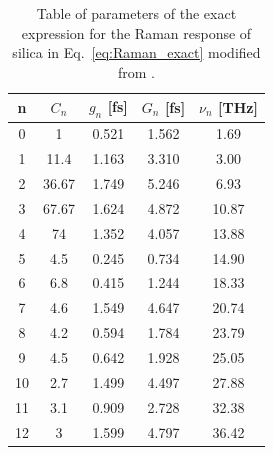 \begin{table}
\begin{center}
    \begin{tabular}{c|c|c|c|c}
    \label{tab:raman_coeffs}
        n  &$C_n$ & $g_n$ [fs] & $G_n$ [fs] & $\nu_n$ [THz]  \\ \hline
        0  &  1    &0.521       &1.562          &1.69   \\
        1  &  11.4 &1.163       &3.310          &3.00   \\
        2  &  36.67&1.749       &5.246          &6.93   \\
        3  &  67.67&1.624       &4.872          &10.87\\
        4  &  74   &1.352       &4.057          &13.88       \\
        5  &  4.5  &0.245       &0.734          & 14.90   \\
        6  &  6.8  &0.415       &1.244          & 18.33   \\
        7  &  4.6  &1.549       &4.647          & 20.74   \\
        8  &  4.2  &0.594       &1.784          & 23.79  \\
        9  &  4.5  &0.642       &1.928          & 25.05   \\
        10 &  2.7  &1.499       &4.497          & 27.88   \\
        11 &  3.1  &0.909       &2.728          & 32.38   \\
        12 &  3    &1.599       &4.797          &   36.42 
    \end{tabular}
    \caption{Table of parameters of the exact expression for the Raman response of silica in Eq.~\ref{eq:Raman_exact} modified from \cite{raman_exact}.  }
    \end{center}
\end{table}

